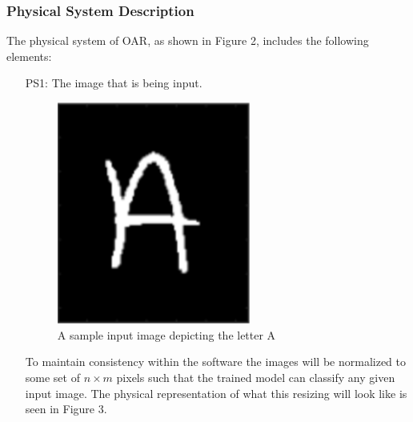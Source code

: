 \documentclass[12pt]{article}
\begin{document}
\subsubsection{Physical System Description} \label{sec_phySystDescrip}

The physical system of OAR, as shown in Figure 2,
includes the following elements:

\begin{itemize}

\item[PS1:] The image that is being input.

\begin{figure}[h!]
  \begin{center}
   \includegraphics[width=0.6\textwidth]{physicalsystempreprocessing}
  \caption{A sample input image depicting the letter A}
  \label{Fig_PSPreproccessing} 
  \end{center}
  \end{figure}

  To maintain consistency within the software the images will be normalized to some set of $n \times m$ pixels such that
  the trained model can classify any given input image. The physical representation of what this resizing will look like
  is seen in Figure 3.


\end{itemize}
\end{document}
